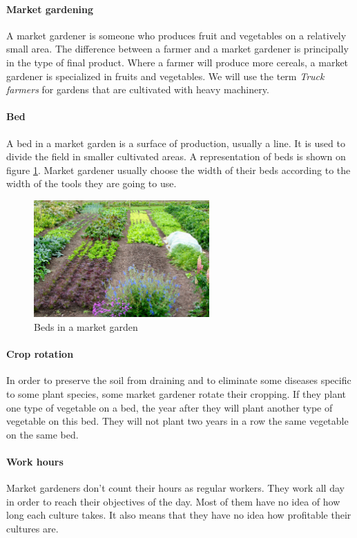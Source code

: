 \paragraph{Market gardening} A market gardener is someone who produces fruit and vegetables on a relatively small area. The difference between a farmer and a market gardener is principally in the type of final product. Where a farmer will produce more cereals, a market gardener is specialized in fruits and vegetables. We will use the term \emph{Truck farmers} for gardens that are cultivated with heavy machinery.  


\paragraph{Bed} A bed in a market garden is a surface of production, usually a line. It is used to divide the field in smaller cultivated areas. A representation of beds is shown on figure \ref{fig:beds}. Market gardener usually choose the width of their beds according to the width of the tools they are going to use.

\begin{figure}
    \centering
    \includegraphics[width=0.6\textwidth]{images/beds.jpg}
    \caption{Beds in a market garden}
    \label{fig:beds}
\end{figure}

\paragraph{Crop rotation} In order to preserve the soil from draining and to eliminate some diseases specific to some plant species, some market gardener rotate their cropping. If they plant one type of vegetable on a bed, the year after they will plant another type of vegetable on this bed. They will not plant two years in a row the same vegetable on the same bed.

\paragraph{Work hours} Market gardeners don't count their hours as regular workers. They work all day in order to reach their objectives of the day. Most of them have no idea of how long each culture takes. It also means that they have no idea how profitable their cultures are. 

